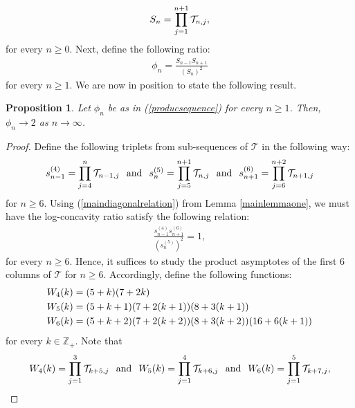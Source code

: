 \documentclass[a4paper,12pt]{article}
\newtheorem{prop}[thm]{Proposition}
\def\Z{\mathbb{Z}}
\def\T{\mathcal{T}}
\begin{document}
\begin{align}
S_n = \prod_{j=1}^{n+1} \T_{n,j}, \notag 
\end{align}
for every $n\geq 0$. Next, define the following ratio:
\begin{align}
\phi_n = \frac{S_{n-1}S_{n+1}}{(S_n)^2} \label{producsequence}
\end{align}
for every $n\geq 1$. We are now in position to state the following result.
\begin{prop}
\label{asymptoticproposition}
Let $\phi_n$ be as in (\ref{producsequence}) for every $n\geq 1$. Then, $\phi_n \rightarrow 2$ as $n \rightarrow \infty$.
\end{prop}
\begin{proof}
Define the following triplets from sub-sequences of $\T$ in the following way:
\begin{align}
s^{(4)}_{n-1} = \prod_{j=4}^{n} \T_{n-1,j} \hspace{0.1in} \text{and} \hspace{0.1in} s^{(5)}_{n} = \prod_{j=5}^{n+1} \T_{n,j} \hspace{0.1in} \text{and} \hspace{0.1in} s^{(6)}_{n+1} = \prod_{j=6}^{n+2} \T_{n+1,j}\notag
\end{align}
for $n\geq 6$. Using (\ref{maindiagonalrelation}) from Lemma \ref{mainlemmaone}, we must have the log-concavity ratio satisfy the following relation:
\begin{align}
\frac{s^{(4)}_{n-1}s^{(6)}_{n+1}}{(s^{(5)}_n)^2} = 1, \label{asymptitcone} 
\end{align}
for every $n\geq 6$. Hence, it suffices to study the product asymptotes of the first 6 columns of $\T$ for $n\geq 6$. Accordingly, define the following functions:
\begin{align}
&W_4(k) = (5+k)(7+2k) \notag \\
&W_5(k) = (5+k+1)(7+2(k+1))(8+3(k+1))\notag \\
&W_6(k) = (5+k+2)(7+2(k+2))(8+3(k+2))(16+6(k+1)) \notag
\end{align}
for every $k\in\Z_+$. Note that  
\begin{align}
W_4(k) = \prod_{j=1}^{3} \T_{k+5,j} \hspace{0.1in} \text{and} \hspace{0.1in} W_5(k) = \prod_{j=1}^{4} \T_{k+6,j} \hspace{0.1in} \text{and} \hspace{0.1in} W_6(k) = \prod_{j=1}^{5} \T_{k+7,j}, \notag
\end{align}

\end{proof}
\end{document}

